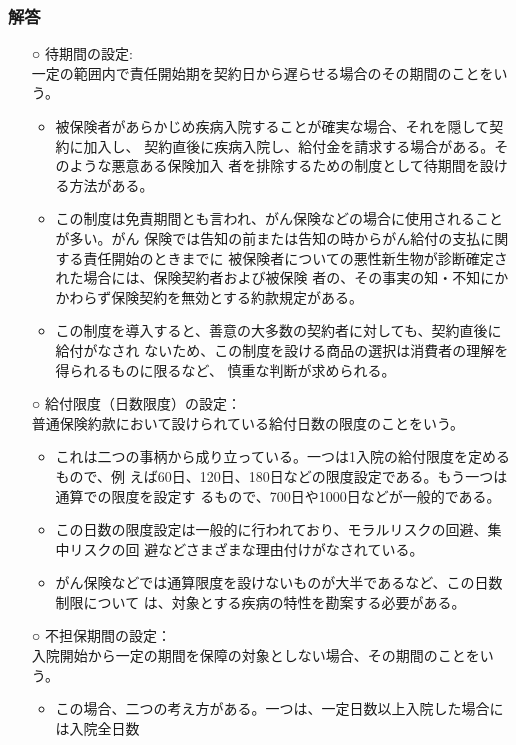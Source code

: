 \documentclass[report,gutter=10mm,fore-edge=10mm,uplatex,dvipdfmx]{jlreq}
\begin{document}
\subsubsection{解答}
\begin{itemize}
 \item [○] 待期間の設定:\\
 一定の範囲内で責任開始期を契約日から遅らせる場合のその期間のことをいう。
\begin{itemize}
 \item 被保険者があらかじめ疾病入院することが確実な場合、それを隠して契約に加入し、
 契約直後に疾病入院し、給付金を請求する場合がある。そのような悪意ある保険加入
 者を排除するための制度として待期間を設ける方法がある。
 \item この制度は免責期間とも言われ、がん保険などの場合に使用されることが多い。がん
 保険では告知の前または告知の時からがん給付の支払に関する責任開始のときまでに
 被保険者についての悪性新生物が診断確定された場合には、保険契約者および被保険
 者の、その事実の知・不知にかかわらず保険契約を無効とする約款規定がある。
 \item この制度を導入すると、善意の大多数の契約者に対しても、契約直後に給付がなされ
 ないため、この制度を設ける商品の選択は消費者の理解を得られるものに限るなど、
 慎重な判断が求められる。
\end{itemize}
 \item [○] 給付限度（日数限度）の設定：\\
 普通保険約款において設けられている給付日数の限度のことをいう。
\begin{itemize}
 \item これは二つの事柄から成り立っている。一つは1入院の給付限度を定めるもので、例
 えば60日、120日、180日などの限度設定である。もう一つは通算での限度を設定す
 るもので、700日や1000日などが一般的である。
 \item この日数の限度設定は一般的に行われており、モラルリスクの回避、集中リスクの回
 避などさまざまな理由付けがなされている。
 \item がん保険などでは通算限度を設けないものが大半であるなど、この日数制限について
 は、対象とする疾病の特性を勘案する必要がある。
\end{itemize}
 \item [○] 不担保期間の設定：\\
 入院開始から一定の期間を保障の対象としない場合、その期間のことをいう。
\begin{itemize}
 \item この場合、二つの考え方がある。一つは、一定日数以上入院した場合には入院全日数

\end{itemize}
\end{itemize}
\end{document}
